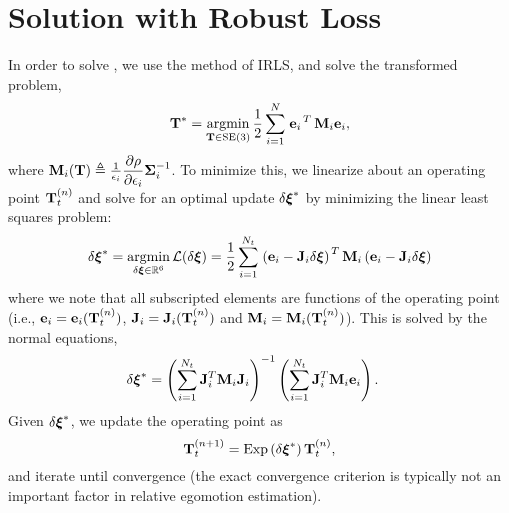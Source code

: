 \section{Solution with Robust Loss}

In order to solve , we use the method of IRLS, and solve the transformed problem,
\begin{equation}
\boldsymbol{\mathbf{T}}^* = \operatorname*{argmin}_{\boldsymbol{\mathbf{T}}\in\text{SE}(3)}\frac{1}{2} \sum_{i=1}^{N} 
\left.{\boldsymbol{\mathbf{e}}_{i}}\right.^T \boldsymbol{\mathbf{M}}_{i} \boldsymbol{\mathbf{e}}_{i},
\end{equation}
where $ \boldsymbol{\mathbf{M}}_i(\boldsymbol{\mathbf{T}}) \triangleq \frac{1}{\epsilon_i} \dfrac{\partial \rho}{\partial \epsilon_i}  \boldsymbol{\mathbf{\Sigma}}_{i}^{-1}$.
To minimize this, we linearize about an operating point $\boldsymbol{\mathbf{T}}_t^{(n)}$ and solve for an optimal update $\delta \boldsymbol{\mathbf{\xi}}^*$ by minimizing the linear least squares problem:
\begin{equation}
\label{eq:appendix_vo_lls}
 \delta \Vector{\xi}^* = \ArgMin{\delta \Vector{\xi} \in \RealNumbers{}^6} \mathcal{L}(\delta \Vector{\xi}) = \frac{1}{2}\sum_{i=1}^{N_t} 
  \Transpose{\left(\Vector{e}_{i}
  - \Matrix J_{i} \delta\Vector{\xi}\right)}
\Matrix{M}_i
 \left(\Vector{e}_{i}
 - \Matrix J_{i} \delta\Vector{\xi}\right)
  \end{equation}
where we note that all subscripted elements are functions of the operating point (i.e., $\boldsymbol{\mathbf{e}}_{i} = \boldsymbol{\mathbf{e}}_{i}(\boldsymbol{\mathbf{T}}_t^{(n)})$, $\boldsymbol{\mathbf{J}}_{i} = \boldsymbol{\mathbf{J}}_{i}(\boldsymbol{\mathbf{T}}_t^{(n)})$ and $\boldsymbol{\mathbf{M}}_{i} = \boldsymbol{\mathbf{M}}_{i}(\boldsymbol{\mathbf{T}}_t^{(n)})$). This is solved by the normal equations,
\begin{align}
\label{eq:vo_appendix_irls_normal}
\delta\boldsymbol{\mathbf{\xi}}^* &= \left( \sum_{i=1}^{N_t} \boldsymbol{\mathbf{J}}_{i}^T \boldsymbol{\mathbf{M}}_i \boldsymbol{\mathbf{J}}_{i} \right)^{-1} \left( \sum_{i=1}^{N_t} \boldsymbol{\mathbf{J}}_{i}^T\boldsymbol{\mathbf{M}}_i \boldsymbol{\mathbf{e}}_i \right).
\end{align}
Given $\delta\boldsymbol{\mathbf{\xi}}^*$, we update the operating point as
\begin{equation}
	  \boldsymbol{\mathbf{T}}_t^{(n+1)} = \mathrm{Exp}\left({\delta\boldsymbol{\mathbf{\xi}}^*}\right) \boldsymbol{\mathbf{T}}_t^{(n)}, 
\end{equation}
and iterate until convergence (the exact convergence criterion is typically not an important factor in relative egomotion estimation).

